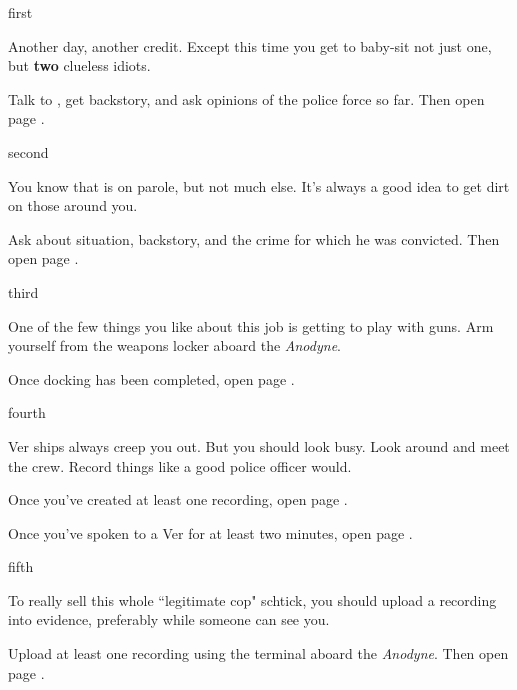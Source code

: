 \documentclass[greennotebook]{guildcamp4} %
\begin{document}
\startnotebook{\nCbadNotebook{}}

\begin{page}{first}

Another day, another credit. Except this time you get to baby-sit not just one, but {\bf two} clueless idiots.

Talk to \cCgood{}, get  backstory, and ask  opinions of the police force so far. Then open page .

\end{page}

\begin{page}{second}

You know that \cPilot{} is on parole, but not much else. It's always a good idea to get dirt on those around you.

Ask \cPilot{} about  situation,  backstory, and the crime for which he was convicted. Then open page .

\end{page}

\begin{page}{third}

One of the few things you like about this job is getting to play with guns. Arm yourself from the weapons locker aboard the \emph{Anodyne}.

Once docking has been completed, open page .

\end{page}

\begin{page}{fourth}

Ver ships always creep you out. But you should look busy. Look around and meet the crew. Record things like a good police officer would.

Once you've created at least one recording, open page .

Once you've spoken to a Ver for at least two minutes, open page .

\end{page}

\begin{page}{fifth}

To really sell this whole ``legitimate cop" schtick, you should upload a recording into evidence, preferably while someone can see you. 

Upload at least one recording using the terminal aboard the \emph {Anodyne}. Then open page .

\end{page}
\end{document}
